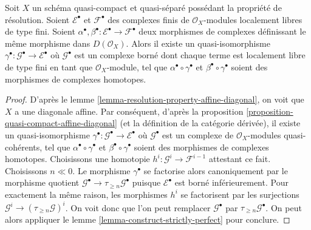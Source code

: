 \begin{lemma}
\label{lemma-resolution-property-homotopy-map-perfect-complex}
Soit $X$ un schéma quasi-compact et quasi-séparé possédant la
propriété de résolution. Soient $\mathcal{E}^\bullet$ et $\mathcal{F}^\bullet$
des complexes finis de $\mathcal{O}_X$-modules localement libres de type fini.
Soient $\alpha^\bullet, \beta^\bullet :\mathcal{E}^\bullet \to \mathcal{F}^\bullet$
deux morphismes de complexes définissant le même morphisme dans $D(\mathcal{O}_X)$.
Alors il existe un quasi-isomorphisme
$\gamma^\bullet : \mathcal{G}^\bullet \to \mathcal{E}^\bullet$
où $\mathcal{G}^\bullet$ est un complexe borné dont chaque terme est localement libre de type fini en tant que
$\mathcal{O}_X$-module,
tel que $\alpha^\bullet \circ \gamma^\bullet$ et
$\beta^\bullet \circ \gamma^\bullet$ soient des morphismes de complexes homotopes.
\end{lemma}

\begin{proof}
D'après le lemme \ref{lemma-resolution-property-affine-diagonal},
on voit que $X$ a une diagonale affine. Par conséquent, d'après la
proposition \ref{proposition-quasi-compact-affine-diagonal}
(et la définition de la catégorie dérivée),
il existe un quasi-isomorphisme
$\gamma^\bullet : \mathcal{G}^\bullet \to \mathcal{E}^\bullet$
où $\mathcal{G}^\bullet$ est un complexe de
$\mathcal{O}_X$-modules quasi-cohérents,
tel que $\alpha^\bullet \circ \gamma^\bullet$ et
$\beta^\bullet \circ \gamma^\bullet$ soient des morphismes de complexes homotopes.
Choisissons une homotopie $h^i : \mathcal{G}^i \to \mathcal{F}^{i - 1}$
attestant ce fait. Choisissons $n \ll 0$. Le morphisme
$\gamma^\bullet$ se factorise alors canoniquement par le morphisme quotient
$\mathcal{G}^\bullet \to \tau_{\geq n}\mathcal{G}^\bullet$
puisque $\mathcal{E}^\bullet$ est borné inférieurement. Pour exactement la même
raison, les morphismes $h^i$ se factorisent par les surjections
$\mathcal{G}^i \to (\tau_{\geq n}\mathcal{G})^i$.
On voit donc que l'on peut remplacer $\mathcal{G}^\bullet$
par $\tau_{\geq n}\mathcal{G}^\bullet$.
On peut alors appliquer le lemme \ref{lemma-construct-strictly-perfect} pour conclure.
\end{proof}


